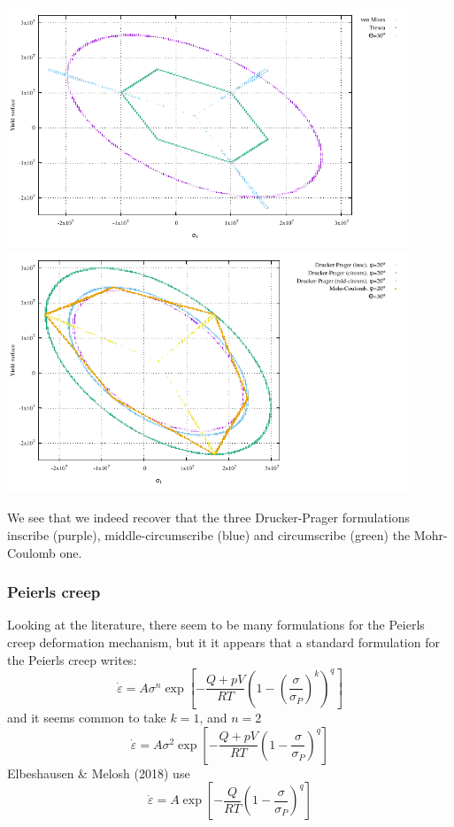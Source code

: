 \begin{center}
\includegraphics[width=12cm]{images/rheology/surfaces/surfaces_plane2.pdf}
\includegraphics[width=12cm]{images/rheology/surfaces/surfaces_plane.pdf}
\end{center}

We see that we indeed recover that the three Drucker-Prager formulations 
inscribe (purple), middle-circumscribe (blue) and circumscribe (green) the 
Mohr-Coulomb one. 



\newpage
\subsubsection{Peierls creep}

Looking at the literature, there seem to be many formulations for the Peierls creep deformation
mechanism, but it it appears that a standard formulation for the Peierls creep writes:
\[
\dot{\varepsilon} = A \sigma^n \exp \left[ -\frac{Q+pV}{RT} \left(1-(\frac{\sigma}{\sigma_P})^k\right)^q  \right]
\]
and it seems common to take $k=1$, and $n=2$ \cite{gery10,kaka08}
\[
\dot{\varepsilon} = A \sigma^2 \exp \left[ -\frac{Q+pV}{RT} \left(1-\frac{\sigma}{\sigma_P}\right)^q  \right]
\]
Elbeshausen \& Melosh (2018) \cite{elme18} use 
\[
\dot{\varepsilon} = A  \exp \left[ -\frac{Q}{RT} \left(1-\frac{\sigma}{\sigma_P}\right)^q  \right]
\]

